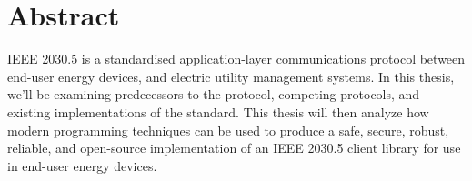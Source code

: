 \chapter*{Abstract}\label{abstract}
IEEE 2030.5 is a standardised application-layer communications protocol between end-user energy devices, and electric utility management systems.
In this thesis, we'll be examining predecessors to the protocol, competing protocols, and existing implementations of the standard.
This thesis will then analyze how modern programming techniques can be used to produce a safe, secure, robust, reliable, and open-source implementation of an IEEE 2030.5 client library for use in end-user energy devices.
